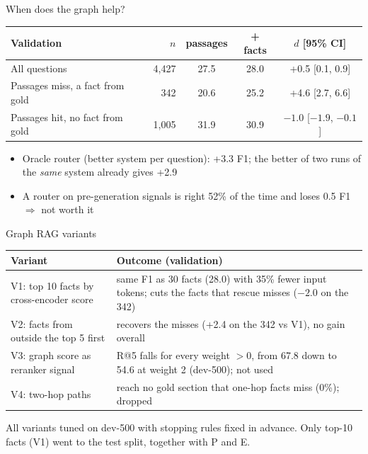 \documentclass[aspectratio=169,11pt]{beamer}
\newcommand{\up}[1]{{\color{green!45!black}#1}}
\newcommand{\down}[1]{{\color{accent}#1}}
\begin{document}
\begin{frame}[label=graphhelp]{When does the graph help?}
\centering
\small
\begin{tabular}{lrccc}
\toprule
Validation & $n$ & passages & + facts & $d$ [95\% CI] \\
\midrule
All questions & 4,427 & 27.5 & 28.0 & +0.5 [0.1, 0.9] \\ %
Passages miss, a fact from gold & 342 & 20.6 & 25.2 & \up{+4.6} [2.7, 6.6] \\ %
Passages hit, no fact from gold & 1,005 & 31.9 & 30.9 & \down{$-1.0$} [$-1.9$, $-0.1$] \\ %
\bottomrule
\end{tabular}

\vspace{5mm}
\begin{itemize}
\item Oracle router (better system per question): +3.3 F1; the better of two runs of the \emph{same} system already gives +2.9 %
\item A router on pre-generation signals is right 52\% of the time and loses 0.5 F1 $\Rightarrow$ not worth it %
\end{itemize}
\end{frame}

\begin{frame}{Graph RAG variants}
\small
\renewcommand{\arraystretch}{1.25}
\begin{tabular}{>{\raggedright}p{4.3cm}>{\raggedright\arraybackslash}p{8.3cm}}
\toprule
Variant & Outcome (validation) \\
\midrule
V1: top 10 facts by cross-encoder score & same F1 as 30 facts (28.0) with 35\% fewer input tokens; cuts the facts that rescue misses ($-2.0$ on the 342) \\ %
\midrule
V2: facts from outside the top 5 first & recovers the misses (+2.4 on the 342 vs V1), no gain overall \\ %
\midrule
V3: graph score as reranker signal & R@5 falls for every weight $> 0$, from 67.8 down to 54.6 at weight 2 (dev-500); not used \\ %
\midrule
V4: two-hop paths & reach no gold section that one-hop facts miss (0\%); dropped \\ %
\bottomrule
\end{tabular}

\vspace{4mm}
\normalsize
All variants tuned on dev-500 with stopping rules fixed in advance. Only top-10 facts (V1) went to the test split, together with P and E.
\end{frame}
\end{document}
